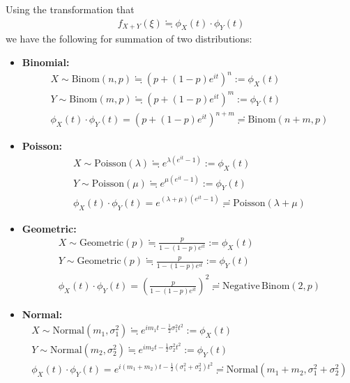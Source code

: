 \documentclass[11pt,a4paper]{article}
\numberwithin{equation}{section}%
\begin{document}
Using the transformation that
\begin{align*}
    f_{X+Y}(\xi )\fallingdotseq \phi_X(t )\cdot \phi_Y(t ) 
\end{align*}
we have the following for summation of two distributions:

\begin{itemize}[topsep=2pt,itemsep=0pt]
    \item \textbf{Binomial:} 
    \begin{align*}
        X\sim \mathrm{ Binom }(n,p)\fallingdotseq (p+(1-p)e^{it})^n := \phi _X(t)\\
        Y\sim \mathrm{ Binom }(m,p)\fallingdotseq (p+(1-p)e^{it})^m := \phi _Y(t)\\
        \phi _X(t)\cdot \phi _Y(t)=(p+(1-p)e^{it})^{n+m}\risingdotseq \mathrm{ Binom }(n+m,p)
    \end{align*}
    \item \textbf{Poisson:}
    \begin{align*}
        X\sim \mathrm{ Poisson }(\lambda )\fallingdotseq e^{\lambda(e^{it}-1)} := \phi _X(t)\\
        Y\sim \mathrm{ Poisson }(\mu )\fallingdotseq e^{\mu(e^{it}-1)} := \phi _Y(t)\\
        \phi _X(t)\cdot \phi _Y(t)=e^{(\lambda+\mu)(e^{it}-1)}\risingdotseq \mathrm{ Poisson }(\lambda+\mu) 
    \end{align*}
    \item \textbf{Geometric:}
    \begin{align*}
        X\sim \mathrm{ Geometric }(p)\fallingdotseq \frac{p}{1-(1-p)e^{it}} := \phi _X(t)\\
        Y\sim \mathrm{ Geometric }(p)\fallingdotseq \frac{p}{1-(1-p)e^{it}} := \phi _Y(t)\\
        \phi _X(t)\cdot \phi _Y(t)=\left(\frac{p}{1-(1-p)e^{it}}\right)^2\risingdotseq \mathrm{ Negative\,Binom }(2,p)
    \end{align*}
    \item \textbf{Normal:}
    \begin{align*}
        X \sim \mathrm{ Normal }(m_1,\sigma _1^2 )\fallingdotseq e^{im_1t-\frac{1}{2}\sigma _1^2t^2} := \phi _X(t)\\
        Y \sim \mathrm{ Normal }(m_2,\sigma _2^2 )\fallingdotseq e^{im_2t-\frac{1}{2}\sigma _2^2t^2} := \phi _Y(t)\\
        \phi _X(t)\cdot \phi _Y(t)=e^{i(m_1+m_2)t-\frac{1}{2}(\sigma _1^2+\sigma _2^2)t^2}\risingdotseq \mathrm{ Normal }(m_1+m_2,\sigma _1^2+\sigma _2^2)

\end{align*}
\end{itemize}
\end{document}
